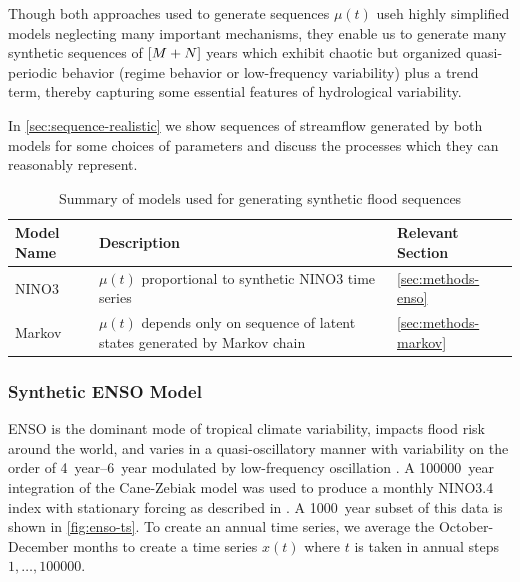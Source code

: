 \documentclass[12pt]{article}
\begin{document}
Though both approaches used to generate sequences \( \mu(t) \) useh highly simplified models neglecting many important mechanisms, they enable us to generate many synthetic sequences of \(\qty[M + N]\) years which exhibit chaotic but organized quasi-periodic behavior (regime behavior or low-frequency variability) plus a trend term, thereby capturing some essential features of hydrological variability.

In \cref{sec:sequence-realistic} we show sequences of streamflow generated by both models for some choices of parameters and discuss the processes which they can reasonably represent.

\begin{table}[bht]
  \begin{center}
    \begin{tabular}{L{1.0in} L{3.0in} L{1.5in}}
      \toprule
        Model Name & Description & Relevant Section \\
      \midrule
        NINO3 & \(\mu(t)\) proportional to synthetic NINO3 time series & \cref{sec:methods-enso} \\
        Markov & \(\mu(t)\) depends only on sequence of latent states generated by Markov chain & \cref{sec:methods-markov} \\
      \bottomrule
    \end{tabular}
  \end{center}
  \caption{Summary of models used for generating synthetic flood sequences\label{tab:model-generating}}
\end{table}

\subsubsection{Synthetic ENSO Model\label{sec:methods-enso}}

ENSO is the dominant mode of tropical climate variability, impacts flood risk around the world, and varies in a quasi-oscillatory manner with variability on the order of \SIrange{4}{6}{year} modulated by low-frequency oscillation \citep[see][for a comprehensive review]{Sarachik2010}.
A \SI{100000}{year} integration of the Cane-Zebiak model \citep{Zebiak1987} was used to produce a monthly NINO3.4 index with stationary forcing as described in \citet{Ramesh2017}.
A \SI{1000}{year} subset of this data is shown in \cref{fig:enso-ts}.
To create an annual time series, we average the October-December months to create a time series \( x(t) \) where \( t \) is taken in annual steps \(1, \ldots, \num{100000} \).
\end{document}
